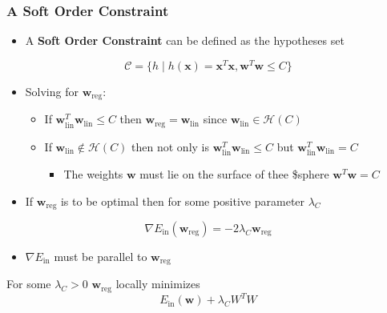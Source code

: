 \documentclass[11pt]{article}
\begin{document}
\subsubsection{A Soft Order Constraint}
\label{sec:org5179c37}
\begin{itemize}
\item A \textbf{Soft Order Constraint} can be defined as the hypotheses set
\end{itemize}
\begin{equation}
    \mathcal{C}=\{h \mid h(\pmb x) = \pmb x ^T\pmb x, \pmb w^T \pmb w \leq C\}
\end{equation}
\begin{itemize}
\item Solving for \(\pmb w_\text{reg}\):
\begin{itemize}
\item If \(\pmb w_\text{lin}^T \pmb w_\text{lin} \leq C\) then \(\pmb w_\text{reg} = \pmb w_\text{lin}\) since \(\pmb w_\text{lin} \in \mathcal H(C)\)
\item If \(\pmb w_\text{lin} \notin \mathcal H(C)\) then not only is \(\pmb w_\text{lin}^T \pmb w_\text{lin} \leq C\) but \(\pmb w_\text{lin}^T \pmb w_\text{lin} = C\)
\begin{itemize}
\item The weights \(\pmb w\) must lie on the surface of thee \$sphere \(\pmb w^T \pmb w = C\)
\end{itemize}
\end{itemize}

\item If \(\pmb w_\text{reg}\) is to be optimal then for some positive parameter \(\lambda_C\)
\end{itemize}
\begin{equation}
  \nabla E_\text{in}(\pmb w_\text{reg}) = - 2 \lambda_C\pmb w_\text{reg}
\end{equation}
\begin{itemize}
\item \(\nabla E_\text{in}\) must be parallel to \(\pmb w_\text{reg}\)
\end{itemize}

For some \(\lambda_C > 0\) \(\pmb w_\text{reg}\) locally minimizes
\begin{equation}
    E_\text{in}(\pmb w) + \lambda_CW^TW
\end{equation}
\end{document}
